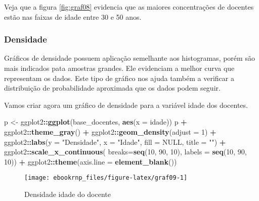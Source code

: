 \documentclass[11pt,]{style/krantz}
\makeatletter
\newenvironment{Shaded}{\begin{snugshade}}{\end{snugshade}}
\newcommand{\DataTypeTok}[1]{\textcolor[rgb]{0.13,0.29,0.53}{#1}}
\newcommand{\DecValTok}[1]{\textcolor[rgb]{0.00,0.00,0.81}{#1}}
\newcommand{\KeywordTok}[1]{\textcolor[rgb]{0.13,0.29,0.53}{\textbf{#1}}}
\newcommand{\NormalTok}[1]{#1}
\newcommand{\OperatorTok}[1]{\textcolor[rgb]{0.81,0.36,0.00}{\textbf{#1}}}
\newcommand{\OtherTok}[1]{\textcolor[rgb]{0.56,0.35,0.01}{#1}}
\newcommand{\StringTok}[1]{\textcolor[rgb]{0.31,0.60,0.02}{#1}}
\newenvironment{kframe}{%
\medskip{}
\setlength{\fboxsep}{.8em}
 \def\at@end@of@kframe{}%
 \ifinner\ifhmode%
  \def\at@end@of@kframe{\end{minipage}}%
  \begin{minipage}{\columnwidth}%
 \fi\fi%
 \def\FrameCommand##1{\hskip\@totalleftmargin \hskip-\fboxsep
 \colorbox{shadecolor}{##1}\hskip-\fboxsep
     \hskip-\linewidth \hskip-\@totalleftmargin \hskip\columnwidth}%
 \MakeFramed {\advance\hsize-\width
   \@totalleftmargin\z@ \linewidth\hsize
   \@setminipage}}%
 {\par\unskip\endMakeFramed%
 \at@end@of@kframe}
\renewenvironment{Shaded}{\begin{kframe}}{\end{kframe}}
\theoremstyle{definition}
\theoremstyle{definition}
\theoremstyle{definition}
\theoremstyle{remark}
\let\BeginKnitrBlock\begin \let\EndKnitrBlock\end
\makeatother
\begin{document}
Veja que a figura \ref{fig:graf08} evidencia que as maiores concentrações de docentes estão nas faixas de idade entre 30 e 50 anos.

\hypertarget{densidade}{%
\subsubsection{Densidade}\label{densidade}}

Gráficos de densidade possuem aplicação semelhante aos histogramas, porém são mais indicados pata amostras grandes. Ele evidenciam a melhor curva que representam os dados. Este tipo de gráfico nos ajuda também a verificar a distribuição de probabilidade aproximada que os dados podem seguir.

\BeginKnitrBlock{example}
\protect\hypertarget{exm:unnamed-chunk-77}{}{\label{exm:unnamed-chunk-77} }Vamos criar agora um gráfico de densidade para a variável idade dos docentes.
\EndKnitrBlock{example}

\begin{Shaded}
\begin{Highlighting}[]
\NormalTok{p <-}\StringTok{ }\NormalTok{ggplot2}\OperatorTok{::}\KeywordTok{ggplot}\NormalTok{(base_docentes, }\KeywordTok{aes}\NormalTok{(}\DataTypeTok{x =}\NormalTok{ idade))}
\NormalTok{p }\OperatorTok{+}\StringTok{ }\NormalTok{ggplot2}\OperatorTok{::}\KeywordTok{theme_gray}\NormalTok{() }\OperatorTok{+}
\StringTok{  }\NormalTok{ggplot2}\OperatorTok{::}\KeywordTok{geom_density}\NormalTok{(}\DataTypeTok{adjust =} \DecValTok{1}\NormalTok{) }\OperatorTok{+}
\StringTok{  }\NormalTok{ggplot2}\OperatorTok{::}\KeywordTok{labs}\NormalTok{(}\DataTypeTok{y =} \StringTok{"Densidade"}\NormalTok{, }\DataTypeTok{x =} \StringTok{"Idade"}\NormalTok{, }\DataTypeTok{fill =} \OtherTok{NULL}\NormalTok{, }\DataTypeTok{title =} \StringTok{""}\NormalTok{) }\OperatorTok{+}
\StringTok{  }\NormalTok{ggplot2}\OperatorTok{::}\KeywordTok{scale_x_continuous}\NormalTok{(}
    \DataTypeTok{breaks=}\KeywordTok{seq}\NormalTok{(}\DecValTok{10}\NormalTok{, }\DecValTok{90}\NormalTok{, }\DecValTok{10}\NormalTok{),}
    \DataTypeTok{labels =} \KeywordTok{seq}\NormalTok{(}\DecValTok{10}\NormalTok{, }\DecValTok{90}\NormalTok{, }\DecValTok{10}\NormalTok{)) }\OperatorTok{+}
\StringTok{  }\NormalTok{ggplot2}\OperatorTok{::}\KeywordTok{theme}\NormalTok{(}\DataTypeTok{axis.line =} \KeywordTok{element_blank}\NormalTok{())}
\end{Highlighting}
\end{Shaded}

\begin{figure}[H]

{\centering \texttt{[image: ebookrnp\_files/figure-latex/graf09-1]} 

}

\caption{Densidade idade do docente}\label{fig:graf09}
\end{figure}
\end{document}
